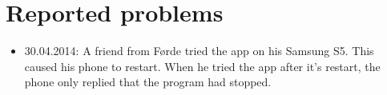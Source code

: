 \section{Reported problems}
\begin{itemize}
	\item 30.04.2014: A friend from F\o{}rde tried the app on his Samsung S5. This caused his phone to restart. When he tried the app after it's restart, the phone only replied that the program had stopped.
\end{itemize}